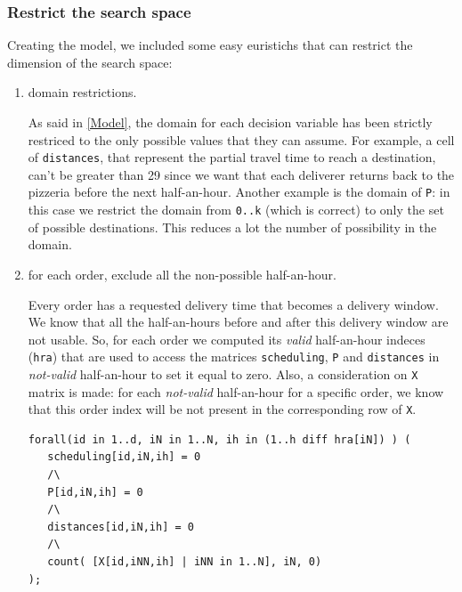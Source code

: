 \documentclass[10pt]{article}
\begin{document}

	\subsubsection{Restrict the search space}
	\label{subsubsec:restrict-search-space}
	Creating the model, we included some easy euristichs that can restrict the dimension
	of the search space:

	\begin{enumerate}

		\item domain restrictions.
		
		As said in \cref{Model}, the domain for each decision variable has been
		strictly restriced to the only possible values that they can assume. 
		For example, a cell of \texttt{distances}, that represent the partial travel time
		to reach a destination, can't be greater than 29 since we want that each deliverer 
		returns back to the pizzeria before the next half-an-hour. Another example is the domain
		of \texttt{P}: in this case we restrict the domain from \texttt{0..k} (which is correct) 
		to only the set of possible destinations. This reduces a lot the number of possibility in 
		the domain. 

		\item for each order, exclude all the non-possible half-an-hour.
		
		Every order has a requested delivery time that becomes a delivery window. 
		We know that all the half-an-hours before and after this delivery window
		are not usable. So, for each order we computed its \textit{valid} half-an-hour 
		indeces (\texttt{hra}) that are used to access the matrices \texttt{scheduling},
		\texttt{P} and \texttt{distances} in \textit{not-valid} half-an-hour to set it equal to zero.   
		Also, a consideration on \texttt{X} matrix is made: for each \textit{not-valid} 
		half-an-hour for a specific order, we know that this order index will be not present
		in the corresponding row of \texttt{X}.


		\begin{verbatim}
forall(id in 1..d, iN in 1..N, ih in (1..h diff hra[iN]) ) (
   scheduling[id,iN,ih] = 0
   /\
   P[id,iN,ih] = 0
   /\
   distances[id,iN,ih] = 0 
   /\
   count( [X[id,iNN,ih] | iNN in 1..N], iN, 0)
);
		\end{verbatim}


\end{enumerate}
\end{document}
